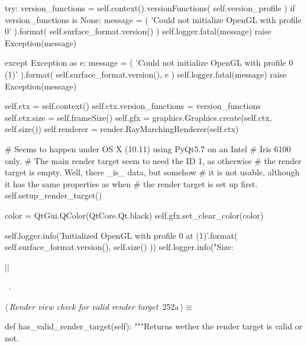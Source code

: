 \documentclass[%
    a4paper,    %
    justified,  %
    nobib,      %
    openany     %
]{tufte-book}
\makeatletter
\renewcommand{\label}[1]{\@tufte@label{##1}}%
\makeatother
\begin{document}
\begin{fullwidth}
\begin{flushleft}
\begin{minipage}{\linewidth}
\begin{pythoncode}
    try:
        version_functions = self.context().versionFunctions(
            self.version_profile
        )
        if version_functions is None:
            message = (
                'Could not initialize OpenGL with profile {0}'
            ).format(
                self.surface_format.version()
            )
            self.logger.fatal(message)
            raise Exception(message)

    except Exception as e:
            message = (
                'Could not initialize OpenGL with profile {0} ({1})'
            ).format(
                self.surface_format.version(),
                e
            )
            self.logger.fatal(message)
            raise Exception(message)

    self.ctx = self.context()
    self.ctx.version_functions = version_functions
    self.ctx.size = self.frameSize()
    self.gfx = graphics.Graphics.create(self.ctx, self.size())
    self.renderer = render.RayMarchingRenderer(self.ctx)

    # Seems to happen under OS X (10.11) using PyQt5.7 on an Intel
    # Iris 6100 only.
    # The main render target seem to need the ID 1, as otherwise
    # the render target is empty. Well, there _is_ data, but somehow
    # it is not usable, although it has the same properties as when
    # the render target is set up first.
    self.setup_render_target()

    color = QtGui.QColor(QtCore.Qt.black)
    self.gfx.set_clear_color(color)

    self.logger.info('Initialized OpenGL with profile {0} at ({1})'.format(
        self.surface_format.version(),
        self.size()
    ))
    self.logger.info("Size: %

|\NWsep|
\end{pythoncode}
\vspace{1.5ex}
\footnotesize
\begin{list}{}{\setlength{\itemsep}{-\parsep}\setlength{\itemindent}{-\leftmargin}}
\item \NWtxtMacroRefIn\ .

\item{}
\end{list}
\end{minipage}\vspace{4ex}
\end{flushleft}
\begin{flushleft} \small
\begin{minipage}{\linewidth}\label{scrap276}\raggedright\small
{} $\langle\,${\itshape Render view check for valid render target}\nobreak\ {\footnotesize {252a}}$\,\rangle\equiv$
\vspace{-1ex}
\begin{pythoncode}
def has_valid_render_target(self):
    """Returns wether the render target is valid or not.


\end{pythoncode}
\end{minipage}
\end{flushleft}
\end{fullwidth}
\end{document}
